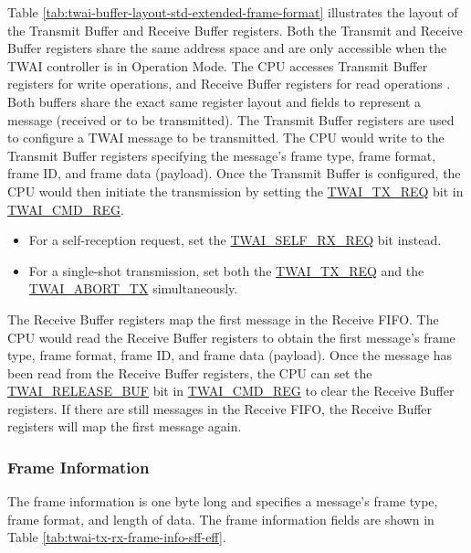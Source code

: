 \documentclass[main\_\_EN.tex]{subfiles}
\begin{document}


Table \ref{tab:twai-buffer-layout-std-extended-frame-format} illustrates the layout of the Transmit Buffer and Receive Buffer registers. Both the Transmit and Receive Buffer registers share the same address space and are only accessible when the TWAI controller is in Operation Mode. The CPU accesses Transmit Buffer registers for write operations, and Receive Buffer registers for read operations . Both buffers share the exact same register layout and fields to represent a message (received or to be transmitted).
The Transmit Buffer registers are used to configure a TWAI message to be transmitted. The CPU would write to the Transmit Buffer registers specifying the message's frame type, frame format, frame ID, and frame data (payload). Once the Transmit Buffer is configured, the CPU would then initiate the transmission by setting the  \hyperref[fielddesc:TWAITXREQ]{TWAI\_TX\_REQ} bit in \hyperref[regdesc:TWAICMDREG]{TWAI\_CMD\_REG}.

\begin{itemize}
    \item For a self-reception request, set the \hyperref[fielddesc:TWAISELFRXREQ]{TWAI\_SELF\_RX\_REQ} bit instead.
    \item For a single-shot transmission, set both the \hyperref[fielddesc:TWAITXREQ]{TWAI\_TX\_REQ} and the \hyperref[fielddesc:TWAIABORTTX]{TWAI\_ABORT\_TX} simultaneously.
\end{itemize}

The Receive Buffer registers map the first message in the Receive FIFO. The CPU would read the Receive Buffer registers to obtain the first message's frame type, frame format, frame ID, and frame data (payload). Once the message has been read from the Receive Buffer registers, the CPU can set the \hyperref[fielddesc:TWAIRELEASEBUF]{TWAI\_RELEASE\_BUF} bit in \hyperref[regdesc:TWAICMDREG]{TWAI\_CMD\_REG} to clear the Receive Buffer registers. If there are still messages in the Receive FIFO, the Receive Buffer registers will map the first message again.

\subsubsection{Frame Information}
The frame information is one byte long and specifies a message's frame type, frame format, and length of data. The frame information fields are shown in Table \ref{tab:twai-tx-rx-frame-info-sff-eff}.
\end{document}
